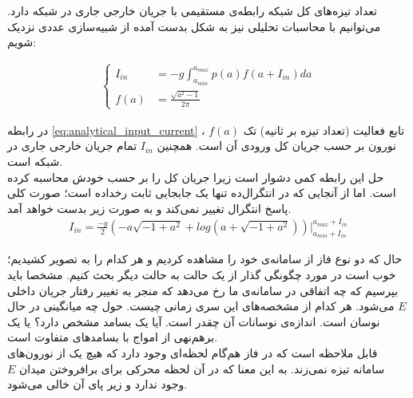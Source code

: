 \documentclass[12pt,onecolumn,a4paper]{article}
\begin{document}
تعداد تیزه‌های کل شبکه رابطه‌ی مستقیمی با جریان خارجی جاری در شبکه دارد. می‌توانیم با محاسبات تحلیلی نیز به شکل بدست آمده از شبیه‌سازی عددی نزدیک شویم:

\begin{align}
\begin{cases}
I_{in} &= -g \int_{a_{min}}^{a_{max}} p(a) f(a + I_{in}) da \\
f(a) &= \frac{\sqrt{a^2 - 1}}{2\pi}
\end{cases}
\label{eq:analytical_input_current}
\end{align}

در رابطه \ref{eq:analytical_input_current} ، $f(a)$ تابع فعالیت (تعداد تیزه بر ثانیه) تک نورون بر حسب جریان کل ورودی آن است. همچنین $I_{in}$ تمام جریان خارجی جاری در شبکه است.\\
حل این رابطه کمی دشوار است زیرا جریان کل را بر حسب خودش محاسبه کرده است. اما از آنجایی که در انتگرال‌ده تنها یک جابجایی ثابت رخداده است؛ صورت کلی پاسخ انتگرال تغییر نمی‌کند و به صورت زیر بدست خواهد آمد.
\begin{align}
I_{in} = \frac{-g}{2} (-a \sqrt{-1 + a^2} + log(a + \sqrt{-1 + a^2})) \Big|_{a_{min} + I_{in}}^{a_{max} + I_{in}}
\end{align}

حال که دو نوع فاز از سامانه‌ی خود را مشاهده کردیم و هر کدام را به تصویر کشیدیم؛ خوب است در مورد چگونگی گذار از یک حالت به حالت دیگر بحث کنیم. مشخصا باید بپرسیم که چه اتفاقی در سامانه‌ی ما رخ می‌دهد که منجر به تغییر رفتار جریان داخلی $E$ می‌شود. هر کدام از مشخصه‌های این سری زمانی چیست. حول چه میانگینی در حال نوسان است. اندازه‌ی نوسانات آن چقدر است. آیا یک بسامد مشخص دارد؟ یا یک برهم‌نهی از امواج با بسامد‌های متفاوت است.\\

قابل ملاحظه است که در فاز هم‌گام لحظه‌ای وجود دارد که هیچ یک از نورون‌های سامانه تیزه نمی‌زند. به این معنا که در آن لحظه محرکی برای برافروختن میدان $E$ وجود ندارد و زیر پای آن خالی می‌شود.



\newpage


\end{document}
